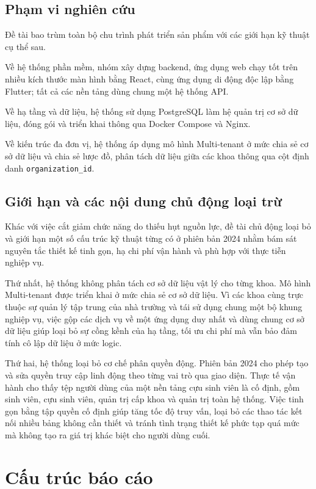 \documentclass[12pt,a4paper,oneside]{report}
\begin{document}
\subsection{Phạm vi nghiên cứu}

Đề tài bao trùm toàn bộ chu trình phát triển sản phẩm với các giới hạn kỹ thuật cụ thể sau.

Về hệ thống phần mềm, nhóm xây dựng backend, ứng dụng web chạy tốt trên nhiều kích thước màn hình bằng React, cùng ứng dụng di động độc lập bằng Flutter; tất cả các nền tảng dùng chung một hệ thống API.

Về hạ tầng và dữ liệu, hệ thống sử dụng PostgreSQL làm hệ quản trị cơ sở dữ liệu, đóng gói và triển khai thông qua Docker Compose và Nginx.

Về kiến trúc đa đơn vị, hệ thống áp dụng mô hình Multi-tenant ở mức chia sẻ cơ sở dữ liệu và chia sẻ lược đồ, phân tách dữ liệu giữa các khoa thông qua cột định danh \texttt{organization\_id}.

\subsection{Giới hạn và các nội dung chủ động loại trừ}

Khác với việc cắt giảm chức năng do thiếu hụt nguồn lực, đề tài chủ động loại bỏ và giới hạn một số cấu trúc kỹ thuật từng có ở phiên bản 2024 nhằm bám sát nguyên tắc thiết kế tinh gọn, hạ chi phí vận hành và phù hợp với thực tiễn nghiệp vụ.

Thứ nhất, hệ thống không phân tách cơ sở dữ liệu vật lý cho từng khoa. Mô hình Multi-tenant được triển khai ở mức chia sẻ cơ sở dữ liệu. Vì các khoa cùng trực thuộc sự quản lý tập trung của nhà trường và tái sử dụng chung một bộ khung nghiệp vụ, việc gộp các dịch vụ về một ứng dụng duy nhất và dùng chung cơ sở dữ liệu giúp loại bỏ sự cồng kềnh của hạ tầng, tối ưu chi phí mà vẫn bảo đảm tính cô lập dữ liệu ở mức logic.

Thứ hai, hệ thống loại bỏ cơ chế phân quyền động. Phiên bản 2024 cho phép tạo và sửa quyền truy cập linh động theo từng vai trò qua giao diện. Thực tế vận hành cho thấy tệp người dùng của một nền tảng cựu sinh viên là cố định, gồm sinh viên, cựu sinh viên, quản trị cấp khoa và quản trị toàn hệ thống. Việc tinh gọn bằng tập quyền cố định giúp tăng tốc độ truy vấn, loại bỏ các thao tác kết nối nhiều bảng không cần thiết và tránh tình trạng thiết kế phức tạp quá mức mà không tạo ra giá trị khác biệt cho người dùng cuối.

\section{Cấu trúc báo cáo}
\end{document}

